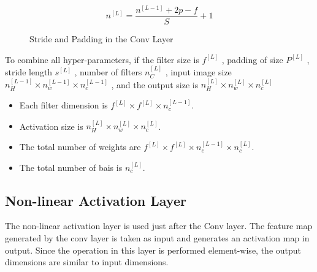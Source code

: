 \begin{equation}
n^{[L]}=\frac{n^{[L-1]}+2 p-f}{S}+1
\end{equation}

\begin{figure}
    \centering
    \caption{Stride and Padding in the Conv Layer}
    \label{Padding}
\end{figure}

To combine all hyper-parameters, if the filter size is $f^{[L]}$ , padding of size $P^{[L]}$ , stride length $s^{[L]}$ , number of filters $n_C^{[L]}$ , input image size $n_H^{[L-1]} \times n_w^{[L-1]} \times n_c^{[L-1]}$ , and the output size is $n_H^{[L]} \times n_w^{[L]} \times n_c^{[L]}$ 

\begin{itemize}
\item Each filter dimension is $f^{[L]} \times f^{[L]} \times n_c^{[L-1]}$.
\item Activation size is $n_H^{[L]} \times n_w^{[L]} \times n_c^{[L]}$.
\item The total number of weights are $f^{[L]} \times f^{[L]} \times n_c^{[L-1]} \times n_c^{[L]}$.
\item The total number of bais is $n_c^{[L]}$. 
\end{itemize}

\subsection{Non-linear Activation Layer}
The non-linear activation layer is used just after the Conv layer. The feature map generated by the conv layer is taken as input and generates an activation map in output. Since the operation in this layer is performed element-wise, the output dimensions are similar to input dimensions. 

